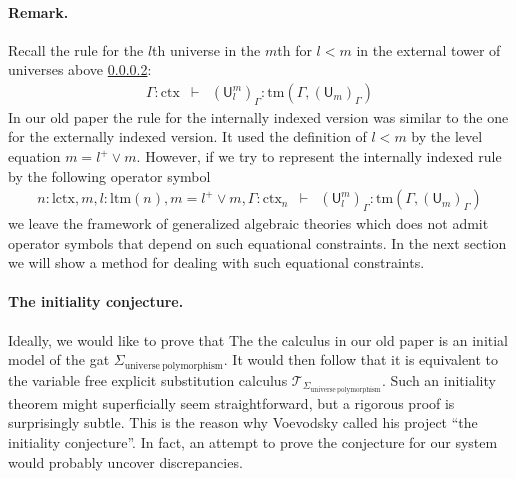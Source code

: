 \documentclass[11pt,a4paper]{article}
\theoremstyle{definition}
\newcommand{\UU}{\mathsf{U}}
\def\UU{\mathsf{U}}
\newcommand{\T}{\mathsf{T}}
\def\lctx{\mathrm{lctx}}
\def\ltm{\mathrm{ltm}}
\newcommand{\ctx}{\mathrm{ctx}}
\newcommand{\tm}{\mathrm{tm}}
\def\T{\mathcal{T}}
\begin{document}
\paragraph{Remark.} Recall the rule for the $l$th universe in the $m$th for $l < m$ in the external tower of universes above \ref{}: 
\begin{eqnarray*}
\Gamma : \ctx&\vdash&(\UU^m_l)_\Gamma: \tm(\Gamma,(\UU_{m})_\Gamma)
\end{eqnarray*}
In our old paper the rule for the internally indexed version was similar to the one for the externally indexed version. It used the definition of $l < m$ by the level equation $m = l^+ \vee m$. However, if we try to represent the internally indexed rule by the following operator symbol
\begin{eqnarray*}
n : \lctx, m, l : \ltm(n), m = l^+ \vee m, \Gamma : \ctx_n &\vdash&(\UU^m_l)_\Gamma: \tm(\Gamma,(\UU_{m})_\Gamma)
\end{eqnarray*}
we leave the framework of generalized algebraic theories which does not admit operator symbols that depend on such equational constraints. In the next section we will show a method for dealing with such equational constraints.

\paragraph{The initiality conjecture.} Ideally, we would like to prove that The the calculus in our old paper is an initial model of the gat  $\Sigma_{\mathrm{universe\ polymorphism}}$. It would then follow that it is equivalent to the variable free explicit substitution calculus $\T_{\Sigma_{\mathrm{universe\ polymorphism}}}$.
Such an initiality theorem might superficially seem straightforward, but a rigorous proof is surprisingly subtle. This is the reason why Voevodsky called his project ``the initiality conjecture''. In fact, an attempt to prove the conjecture for our system would probably uncover discrepancies.
\end{document}
